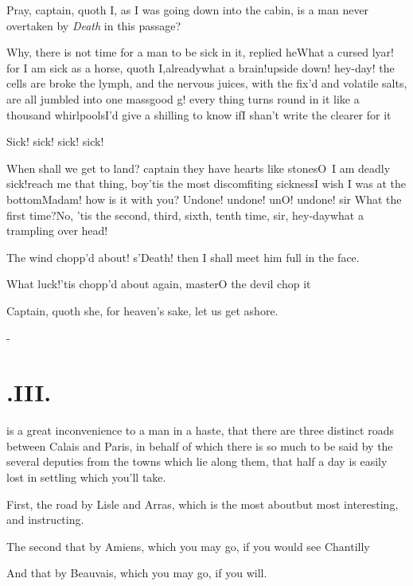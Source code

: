 \documentclass{article}
\begin{document}
Pray, captain, quoth I, as I was going down into the cabin, is a man never overtaken
by \textit{Death} in this passage?

Why, there is not time for a man to be\break
sick in it, replied he\tsh What a cursed\break
lyar! for I am sick as a horse, quoth I,\break already\tsh what a brain!\tsh upside down!\tsh
hey-day! the cells are broke 
 the lymph,
and the nervous juices, with the fix’d and volatile salts, are all jumbled into one
mass\tsh good \hbox{g\tsk!} every thing turns round in it like a thousand whirl\-pools\tsh I’d
give a shilling to know if\break I shan’t write the clearer for it\tsh

Sick! sick! sick! sick!\tsh{}

\tsk When shall we get to land? captain\break
\tsk they have hearts like stones\tsh O~I\break
am deadly sick!\tsh reach me that thing, boy\tsh ’tis the most discomfiting sickness\tsh I wish I
was at the bottom\tsk Madam! how is it with you? Undone! undone! un\tsh O! undone!  sir
\tsh What the first time?\tsh No, ’tis the second, third, sixth, tenth time, sir,\tsh
hey-day\tsk what a trampling over head!\break
{}

The wind chopp’d about! s’Death!\tsk\break
then I shall meet him full in the face.

What luck!\tsk ’tis chopp’d about again, master\tsh O the devil chop it\tsh

Captain, quoth she, for heaven’s sake, let us get ashore.

\vfill{}\eject
\null\kern-\baselineskip
\section{.\enspace III.}

 is a great inconvenience to a man in a haste, that there are three
distinct roads between Calais and Paris, in behalf of which there
is so much to be said by the several deputies from the towns which lie along them,
that half a day is easily lost in settling which you’ll take.

First, the road by Lisle and Arras, which is the
most about\tsh but most interesting, and instructing.

The second that by Amiens, which you may go, if you
would see Chantilly\tsh

And that by Beauvais, which you may go, if you will.
\end{document}
